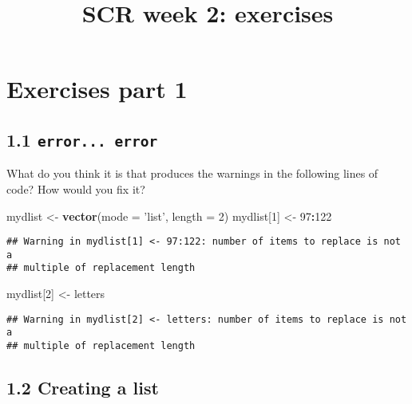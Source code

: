 \documentclass[]{article}
\title{SCR week 2: exercises}
\author{}
\date{}
\newenvironment{Shaded}{\begin{snugshade}}{\end{snugshade}}
\newcommand{\DataTypeTok}[1]{\textcolor[rgb]{0.13,0.29,0.53}{#1}}
\newcommand{\DecValTok}[1]{\textcolor[rgb]{0.00,0.00,0.81}{#1}}
\newcommand{\KeywordTok}[1]{\textcolor[rgb]{0.13,0.29,0.53}{\textbf{#1}}}
\newcommand{\NormalTok}[1]{#1}
\newcommand{\OperatorTok}[1]{\textcolor[rgb]{0.81,0.36,0.00}{\textbf{#1}}}
\newcommand{\StringTok}[1]{\textcolor[rgb]{0.31,0.60,0.02}{#1}}
\begin{document}
\maketitle

\hypertarget{exercises-part-1}{%
\section{Exercises part 1}\label{exercises-part-1}}

\hypertarget{error...-error}{%
\subsection{\texorpdfstring{1.1
\texttt{error...\ error}}{1.1 error... error}}\label{error...-error}}

What do you think it is that produces the warnings in the following
lines of code? How would you fix it?

\begin{Shaded}
\begin{Highlighting}[]
\NormalTok{mydlist <-}\StringTok{ }\KeywordTok{vector}\NormalTok{(}\DataTypeTok{mode =} \StringTok{'list'}\NormalTok{, }\DataTypeTok{length =} \DecValTok{2}\NormalTok{)}
\NormalTok{mydlist[}\DecValTok{1}\NormalTok{] <-}\StringTok{ }\DecValTok{97}\OperatorTok{:}\DecValTok{122}
\end{Highlighting}
\end{Shaded}

\begin{verbatim}
## Warning in mydlist[1] <- 97:122: number of items to replace is not a
## multiple of replacement length
\end{verbatim}

\begin{Shaded}
\begin{Highlighting}[]
\NormalTok{mydlist[}\DecValTok{2}\NormalTok{] <-}\StringTok{ }\NormalTok{letters}
\end{Highlighting}
\end{Shaded}

\begin{verbatim}
## Warning in mydlist[2] <- letters: number of items to replace is not a
## multiple of replacement length
\end{verbatim}

\hypertarget{creating-a-list}{%
\subsection{1.2 Creating a list}\label{creating-a-list}}
\end{document}
